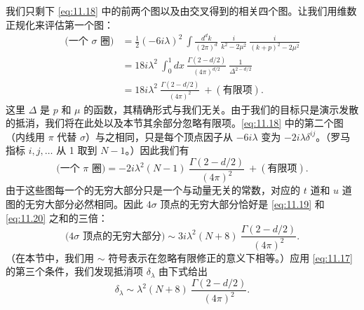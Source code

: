 我们只剩下 \eqref{eq:11.18} 中的前两个图以及由交叉得到的相关四个图。让我们用维数正规化来评估第一个图：
\begin{equation}
  \begin{aligned}
    \text{(一个 $\sigma$ 圈)} &= \frac{1}{2}(-6i\lambda)^2\ \int
      \frac{d^dk}{(2\pi)^d}\ \frac{i}{k^2-2\mu^2}\ \frac{i}{(k+p)^2-2\mu^2}\\
    &= 18i\lambda^2\ \int_0^1 dx\ \frac{\Gamma(2-d/2)}{(4\pi)^{d/2}}\
      \frac{1}{\Delta^{2-d/2}}\\
    &= 18i\lambda^2\ \frac{\Gamma(2-d/2)}{(4\pi)^2}\ + (\text{有限项}).
  \end{aligned}
  \label{eq:11.19}
\end{equation}
这里 $\Delta$ 是 $p$ 和 $\mu$ 的函数，其精确形式与我们无关。由于我们的目标只是演示发散的抵消，我们将在此处以及本节其余部分忽略有限项。\eqref{eq:11.18} 中的第二个图（内线用 $\pi$ 代替 $\sigma$）与之相同，只是每个顶点因子从 $-6i\lambda$ 变为 $-2i\lambda\delta^{ij}$。（罗马指标 $i, j, \ldots$ 从 1 取到 $N-1$。）因此我们有
\begin{equation}
  \text{(一个 $\pi$ 圈)} = -2i\lambda^2(N-1)\ \frac{\Gamma(2-d/2)}
    {(4\pi)^2}\ + (\text{有限项}) .
  \label{eq:11.20}
\end{equation}
由于这些图每一个的无穷大部分只是一个与动量无关的常数，对应的 $t$ 道和 $u$ 道图的无穷大部分必然相同。因此 $4\sigma$ 顶点的无穷大部分恰好是 \eqref{eq:11.19} 和 \eqref{eq:11.20} 之和的三倍：
\begin{equation}
  \text{($4\sigma$ 顶点的无穷大部分)} \sim 3i\lambda^2(N+8)\
    \frac{\Gamma(2-d/2)}{(4\pi)^2} .
  \label{eq:11.21}
\end{equation}
（在本节中，我们用 $\sim$ 符号表示在忽略有限修正的意义下相等。）应用 \eqref{eq:11.17} 的第三个条件，我们发现抵消项 $\delta_\lambda$ 由下式给出
\begin{equation}
  \delta_\lambda \sim \lambda^2(N+8)\ \frac{\Gamma(2-d/2)}{(4\pi)^2} .
  \label{eq:11.22}
\end{equation}

